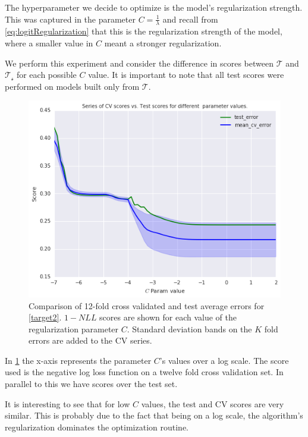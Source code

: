 The hyperparameter we decide to optimize is the model's regularization strength.
This was captured in the parameter $C = \frac{1}{\lambda}$ and recall from \cref{eq:logitRegularization} that this is the regularization strength of the model, where a smaller value in $C$ meant a stronger regularization.

We perform this experiment and consider the difference in scores between  $\mathcal{T}$ and $\mathcal{T_s}$ for each possible $C$ value.
It is important to note that all test scores were performed on models built only from $\mathcal{T}$.


\begin{figure}[h!]
\begin{center}
\includegraphics[width=1\columnwidth]{figures/cross_validation/train_and_cv_score_comparison_logreg.jpg}
\caption{ Comparison of 12-fold cross validated and test average errors for \cref{target2}.   $1-NLL$ scores are shown for each value of the regularization parameter $C$. Standard deviation bands on the $K$ fold errors are added to the CV series.}
\label{fig:cv_vs_test_score}
\end{center}
\end{figure}

In \cref{fig:cv_vs_test_score} the x-axis represents the parameter $C$'s values over a log scale.
The score used is the negative log loss function on a twelve fold cross validation set.
In parallel to this we have scores over the test set.

It is interesting to see that for low $C$ values, the test and CV scores are very similar.
This is probably due to the fact that being on a log scale, the algorithm's regularization dominates the optimization routine.

